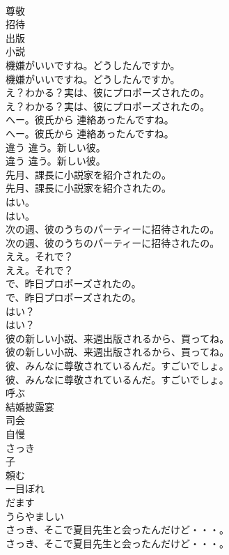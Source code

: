 \documentclass[8pt]{extreport}
\begin{document}
\begin{CJK}{UTF8}{min}
\\	尊敬
\\	招待
\\	出版
\\	小説
\\	機嫌がいいですね。どうしたんですか。	
\\	機嫌がいいですね。どうしたんですか。 
\\	え？わかる？実は、彼にプロポーズされたの。	
\\	え？わかる？実は、彼にプロポーズされたの。 
\\	へー。彼氏から 連絡あったんですね。	
\\	へー。彼氏から 連絡あったんですね。 
\\	違う 違う。新しい彼。	
\\	違う 違う。新しい彼。 
\\	先月、課長に小説家を紹介されたの。	
\\	先月、課長に小説家を紹介されたの。 
\\	はい。	
\\	はい。 
\\	次の週、彼のうちのパーティーに招待されたの。	
\\	次の週、彼のうちのパーティーに招待されたの。 
\\	ええ。それで？	
\\	ええ。それで？ 
\\	で、昨日プロポーズされたの。	
\\	で、昨日プロポーズされたの。 
\\	はい？	
\\	はい？ 
\\	彼の新しい小説、来週出版されるから、買ってね。	
\\	彼の新しい小説、来週出版されるから、買ってね。 
\\	彼、みんなに尊敬されているんだ。すごいでしょ。	
\\	彼、みんなに尊敬されているんだ。すごいでしょ。 
\\	呼ぶ
\\	結婚披露宴
\\	司会
\\	自慢
\\	さっき
\\	子
\\	頼む
\\	一目ぼれ
\\	だます
\\	うらやましい
\\	さっき、そこで夏目先生と会ったんだけど・・・。	
\\	さっき、そこで夏目先生と会ったんだけど・・・。 

\end{CJK}
\end{document}
